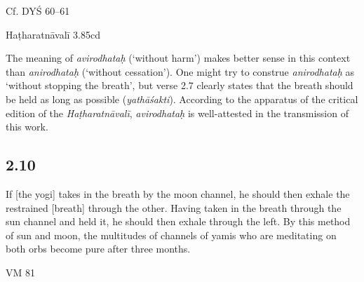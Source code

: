 \begin{ekdosis}
\begin{sources}[hp02_009]
Cf. DYŚ 60--61

\begin{versinnote}
\end{versinnote}
\end{sources}

\begin{testimonia}[hp02_009]
Haṭharatnāvalī 3.85cd%

\begin{versinnote}
\end{versinnote}
\end{testimonia}

\begin{philcomm}[hp02_009]
The meaning of \emph{avirodhataḥ} (‘without harm’) makes better sense in this context than \emph{anirodhataḥ} (‘without cessation’). One might try to construe \emph{anirodhataḥ} as ‘without stopping the breath’, but verse 2.7 clearly states that the breath should be held as long as possible (\emph{yathāśakti}). According to the apparatus of the critical edition of the \emph{Haṭharatnāvalī}, \emph{avirodhataḥ} is well-attested in the transmission of this work.
\end{philcomm}

\subsection*{2.10}
\begin{translation}[hp02_010]
If [the yogi] takes in the breath by the moon channel, he should then exhale the restrained [breath] through the other. Having taken in the breath through the sun channel and held it, he should then exhale through the left. By this method of sun and moon, the multitudes of channels of yamis who are meditating on both orbs become pure after three months.
\end{translation}

\begin{sources}[hp02_010]
VM 81

\begin{versinnote}
\end{versinnote}
\end{sources}


\end{ekdosis}
